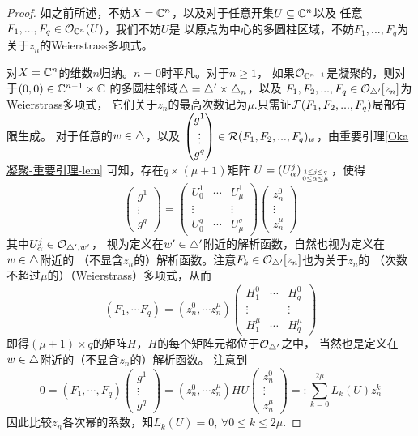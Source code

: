 \begin{proof}
如之前所述，不妨$X=\mathbb{C}^n$，以及对于任意开集$U\subseteq\mathbb{C}^n$以及
任意$F_1,...,F_q\in\mathcal{O}_{\mathbb{C}^n}(U)$，我们不妨$U$是
以原点为中心的多圆柱区域，不妨$F_1,...,F_q$为关于$z_n$的Weierstrass多项式。

对$X=\mathbb{C}^n$的维数$n$归纳。$n=0$时平凡。对于$n\geq 1$，
如果$\mathcal{O}_{\mathbb{C}^{n-1}}$是凝聚的，则对于$(0,0)\in\mathbb{C}^{n-1}\times\mathbb{C}$
的多圆柱邻域$\triangle=\triangle'\times\triangle_n$，以及
$F_1,F_2,...,F_q\in\mathcal{O}_{\triangle'}[z_n]$为Weierstrass多项式，
它们关于$z_n$的最高次数记为$\mu$.只需证$\mathcal{F}(F_1,F_2,...,F_q)$局部有限生成。
对于任意的$w\in\triangle$，以及
$
  \begin{pmatrix}
    g^1 \\
    \vdots \\
    g^q
  \end{pmatrix}
\in\mathcal{R}(F_1,F_2,...,F_q)_w
$，由重要引理\ref{Oka凝聚-重要引理-lem}
可知，存在$q\times(\mu+1)$矩阵
$U=(U^j_\alpha)_{1\leq j\leq q\atop 0\leq\alpha\leq\mu}$，使得
$$
  \begin{pmatrix}
    g^1 \\
    \vdots \\
    g^q
  \end{pmatrix}
=
  \begin{pmatrix}
    U^1_0   & \cdots & U^1_\mu \\
    \vdots  &        & \vdots  \\
    U^q_0   & \cdots & U^q_\mu
  \end{pmatrix}
  \begin{pmatrix}
    z_n^0   \\
    \vdots  \\
    z_n^\mu
  \end{pmatrix}
$$
其中$U^j_\alpha\in\mathcal{O}_{\triangle',w'}$，
视为定义在$w'\in\triangle'$附近的解析函数，自然也视为定义在$w\in\triangle$附近的
（不显含$z_n$的）解析函数。注意$F_k\in\mathcal{O}_{\triangle'}[z_n]$也为关于$z_n$的
（次数不超过$\mu$的）（Weierstrass）多项式，从而
$$
  (F_1,\cdots F_q)
=
  (z_n^0,\cdots z_n^\mu)
  \begin{pmatrix}
    H^0_1   & \cdots & H^0_q  \\
    \vdots  &        & \vdots \\
    H^\mu_1 & \cdots & H^\mu_q
  \end{pmatrix}
$$
即得$(\mu+1)\times q$的矩阵$H$，$H$的每个矩阵元都位于$\mathcal{O}_{\triangle'}$之中，
当然也是定义在$w\in\triangle$附近的（不显含$z_n$的）解析函数。
注意到
$$
  0
=
  (F_1,\cdots,F_q)
  \begin{pmatrix}
    g^1   \\
    \vdots \\
    g^q
  \end{pmatrix}
=
  (z_n^0,\cdots z_n^\mu)
  HU
  \begin{pmatrix}
    z_n^0   \\
    \vdots  \\
    z_n^\mu
  \end{pmatrix}
=:
  \sum_{k=0}^{2\mu}L_k(U)z_n^k
$$
因此比较$z_n$各次幂的系数，知$L_k(U)=0,\,\forall0\leq k\leq 2\mu$.\vs 


\end{proof}
